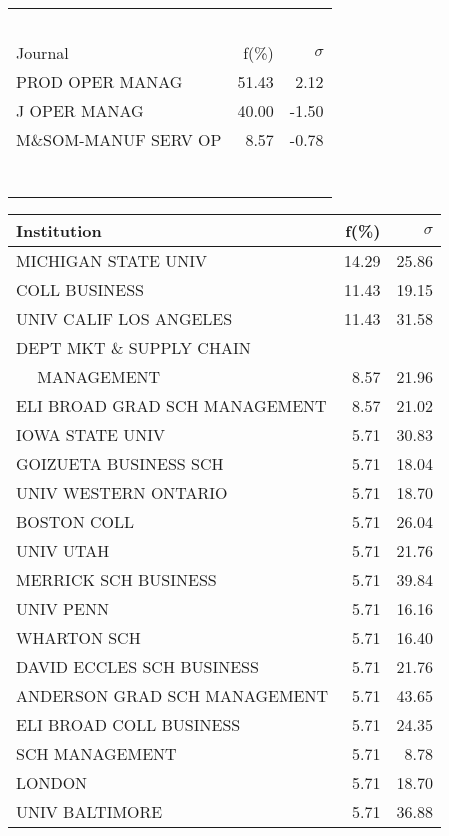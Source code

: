 \documentclass[a4paper,11pt]{report}
\begin{document}
\begin{landscape}
\begin{table}[!ht]
{\begin{tabular}{|l r  r|}
 &  & \\
 &  & \\
 &  & \\
 &  & \\
 &  & \\
\hline
\hline
Journal & f(\%) & $\sigma$\\
\hline
PROD OPER MANAG & 51.43 & 2.12\\
J OPER MANAG & 40.00 & -1.50\\
M\&SOM-MANUF SERV OP & 8.57 & -0.78\\
 &  & \\
 &  & \\
 &  & \\
 &  & \\
 &  & \\
 &  & \\
 &  & \\
\hline
\end{tabular}
}
{\scriptsize\begin{tabular}{|l r r|}
\hline
Institution & f(\%) & $\sigma$\\
\hline
MICHIGAN STATE UNIV & 14.29 & 25.86\\
COLL BUSINESS & 11.43 & 19.15\\
UNIV CALIF LOS ANGELES & 11.43 & 31.58\\
DEPT MKT \& SUPPLY CHAIN &  & \\
$\quad$ MANAGEMENT & 8.57 & 21.96\\
ELI BROAD GRAD SCH MANAGEMENT & 8.57 & 21.02\\
IOWA STATE UNIV & 5.71 & 30.83\\
GOIZUETA BUSINESS SCH & 5.71 & 18.04\\
UNIV WESTERN ONTARIO & 5.71 & 18.70\\
BOSTON COLL & 5.71 & 26.04\\
UNIV UTAH & 5.71 & 21.76\\
MERRICK SCH BUSINESS & 5.71 & 39.84\\
UNIV PENN & 5.71 & 16.16\\
WHARTON SCH & 5.71 & 16.40\\
DAVID ECCLES SCH BUSINESS & 5.71 & 21.76\\
ANDERSON GRAD SCH MANAGEMENT & 5.71 & 43.65\\
ELI BROAD COLL BUSINESS & 5.71 & 24.35\\
SCH MANAGEMENT & 5.71 & 8.78\\
LONDON & 5.71 & 18.70\\
UNIV BALTIMORE & 5.71 & 36.88\\

\end{tabular}}
\end{table}
\end{landscape}
\end{document}
